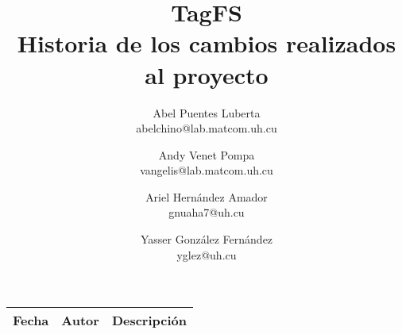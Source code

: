 \documentclass{article}
\title{
	\LARGE{TagFS} \\
	\Large{Historia de los cambios realizados al proyecto}
}
\author{
  	Abel Puentes Luberta \\
  	\small{abelchino@lab.matcom.uh.cu}
  	\and
  	Andy Venet Pompa \\
  	\small{vangelis@lab.matcom.uh.cu}
  	\and
  	Ariel Hernández Amador \\
  	\small{gnuaha7@uh.cu}
  	\and
  	Yasser González Fernández \\
  	\small{yglez@uh.cu} 	
}
\date{}
\begin{document}
\maketitle

\thispagestyle{empty}

\newpage

\setcounter{page}{1}

\begin{center}
\begin{longtable}{|l|l|p{18em}|}
\hline 
\textbf{Fecha} & \textbf{Autor} & \textbf{Descripción} \\
\hline

\end{longtable}
\end{center}
\end{document}
